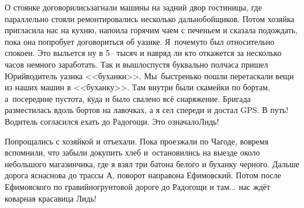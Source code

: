 О стоянке договорились\mdash загнали машины на задний двор гостиницы, где параллельно стояли ремонтировались несколько дальнобойщиков. Потом хозяйка пригласила нас на кухню, напоила горячим чаем с печеньем и сказала подождать, пока она попробует договориться об уазике. Я~почему\sdash то был относительно спокоен. Это выльется ну в 5\thinspace\nobreakdash-- тысяч и навряд ли кто откажется за несколько часов немного заработать. Так и вышло\mdash спустя буквально полчаса пришел Юрий\mdash водитель уазика <<буханки>>. Мы~быстренько пошли перетаскали вещи из наших машин в <<буханку>>. Там внутри были скамейки по бортам, а~посередине пустота, куда и было свалено всё снаряжение. Бригада разместилась вдоль бортов на лавочках, а я сел спереди и достал GPS. В путь! Водитель согласился ехать до Радогощи. Это означало\mdash Лидь!

Попрощались с хозяйкой и отъехали. Пока проезжали по Чагоде, вовремя вспомнили, что забыли докупить хлеб и~остановились на выезде около небольшого магазинчика, где я взял три батона белого и буханку черного. Дальше дорога ясна\mdash снова до трассы А, поворот направо\mdash на Ефимовский. Потом после Ефимовского по гравийно\sdash грунтовой дороге до Радогощи и там$\ldots$ нас ждёт коварная красавица Лидь!

\begin{center}
\end{center}